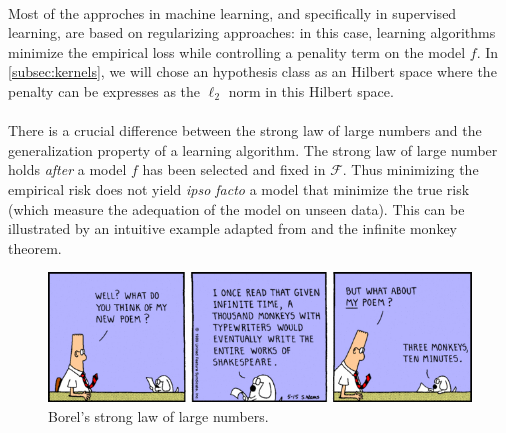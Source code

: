 \paragraph{}
Most of the approches in machine learning, and specifically in supervised
learning, are based on regularizing approaches: in this case, learning
algorithms minimize the empirical loss while controlling a penality term on the
model $f$. In \cref{subsec:kernels}, we will chose an hypothesis class as an
Hilbert space where the penalty can be expresses as the $\ell_2$ norm in this
Hilbert space.
\paragraph{}
There is a crucial difference between the strong law of large numbers and the
generalization property of a learning algorithm. The strong law of large number
holds \emph{after} a model $f$ has been selected and fixed in $\mathcal{F}$.
Thus minimizing the empirical risk does not yield \emph{ipso facto} a model that
minimize the true risk (which measure the adequation of the model on unseen
data). This can be illustrated by an intuitive example adapted from
\citet[page 64]{cornuejols2011apprentissage} and the infinite monkey theorem.
\begin{figure}
    \centering\includegraphics[width=\textwidth]{./gfx/infinite_monkey.jpg}
    \caption{Borel's strong law of large numbers.}
\end{figure}

